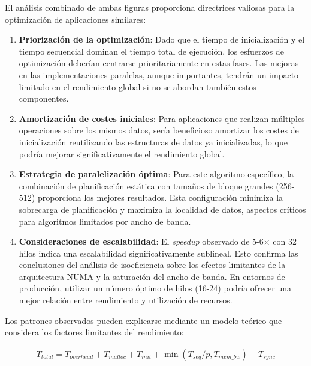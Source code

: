         El análisis combinado de ambas figuras proporciona directrices valiosas para la optimización de aplicaciones similares:
    
        \begin{enumerate}
        
            \item \textbf{Priorización de la optimización}: Dado que el tiempo de inicialización y el tiempo secuencial dominan el tiempo total de ejecución, los esfuerzos de optimización deberían centrarse prioritariamente en estas fases. Las mejoras en las implementaciones paralelas, aunque importantes, tendrán un impacto limitado en el rendimiento global si no se abordan también estos componentes.
            
            \item \textbf{Amortización de costes iniciales}:    Para aplicaciones que realizan múltiples operaciones sobre los mismos datos, sería beneficioso amortizar los costes de inicialización reutilizando las estructuras de datos ya inicializadas, lo que podría mejorar significativamente el rendimiento global.
            
            \item \textbf{Estrategia de paralelización óptima}: Para este algoritmo específico, la combinación de planificación estática con tamaños de bloque grandes (256-512) proporciona los mejores resultados. Esta configuración minimiza la sobrecarga de planificación y maximiza la localidad de datos, aspectos críticos para algoritmos limitados por ancho de banda.
            
            \item \textbf{Consideraciones de escalabilidad}: El \textit{speedup} observado de 5-6× con 32 hilos indica una escalabilidad significativamente sublineal. Esto confirma las conclusiones del análisis de isoeficiencia sobre los efectos limitantes de la arquitectura NUMA y la saturación del ancho de banda. En entornos de producción, utilizar un número óptimo de hilos (16-24) podría ofrecer una mejor relación entre rendimiento y utilización de recursos.
    
        \end{enumerate}
    
        Los patrones observados pueden explicarse mediante un modelo teórico que considera los factores limitantes del rendimiento:
        
        \begin{align}
            T_{total} = T_{overhead} + T_{malloc} + T_{init} + \min(T_{seq}/p, T_{mem\_bw}) + T_{sync}
        \end{align}
        

